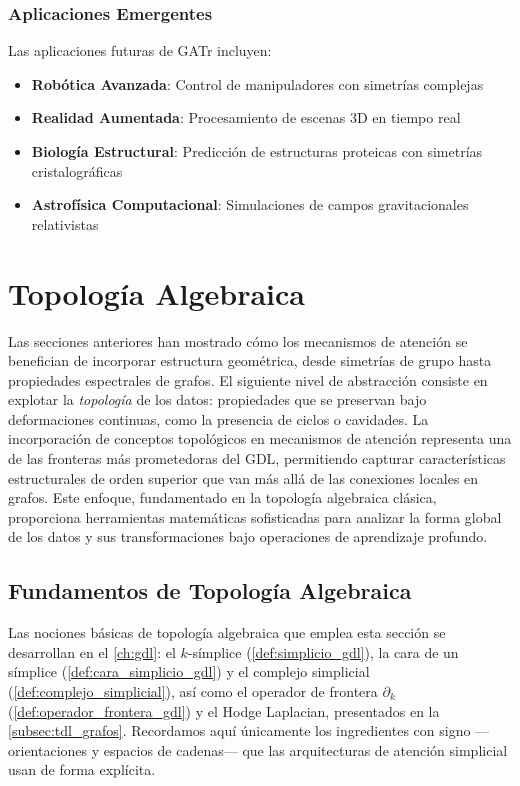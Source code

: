 \subsubsection{Aplicaciones Emergentes}

Las aplicaciones futuras de GATr incluyen:
\begin{itemize}
    \item \textbf{Robótica Avanzada}: Control de manipuladores con simetrías complejas
    \item \textbf{Realidad Aumentada}: Procesamiento de escenas 3D en tiempo real
    \item \textbf{Biología Estructural}: Predicción de estructuras proteicas con simetrías cristalográficas
    \item \textbf{Astrofísica Computacional}: Simulaciones de campos gravitacionales relativistas
\end{itemize}

\section{Topología Algebraica}

Las secciones anteriores han mostrado cómo los mecanismos de atención se benefician de incorporar estructura geométrica, desde simetrías de grupo hasta propiedades espectrales de grafos. El siguiente nivel de abstracción consiste en explotar la \textit{topología} de los datos: propiedades que se preservan bajo deformaciones continuas, como la presencia de ciclos o cavidades. La incorporación de conceptos topológicos en mecanismos de atención representa una de las fronteras más prometedoras del \gls{GDL}, permitiendo capturar características estructurales de orden superior que van más allá de las conexiones locales en grafos. Este enfoque, fundamentado en la topología algebraica clásica, proporciona herramientas matemáticas sofisticadas para analizar la forma global de los datos y sus transformaciones bajo operaciones de aprendizaje profundo.

\subsection{Fundamentos de Topología Algebraica}

Las nociones básicas de topología algebraica que emplea esta sección se desarrollan en el \autoref{ch:gdl}: el $k$-símplice (\autoref{def:simplicio_gdl}), la cara de un símplice (\autoref{def:cara_simplicio_gdl}) y el complejo simplicial (\autoref{def:complejo_simplicial}), así como el operador de frontera $\partial_k$ (\autoref{def:operador_frontera_gdl}) y el Hodge Laplacian, presentados en la \autoref{subsec:tdl_grafos}. Recordamos aquí únicamente los ingredientes con signo —orientaciones y espacios de cadenas— que las arquitecturas de atención simplicial usan de forma explícita.

